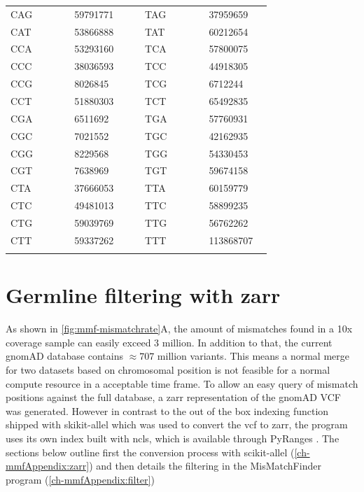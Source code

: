 \begin{table}[!ht]
\begin{tabular}{|C{0.2\linewidth} | R{0.15\linewidth}| C{0.04\linewidth} |C{0.2\linewidth} | R{0.15\linewidth}|}
CAG & \num{ 59791771} &  &TAG & \num{ 37959659} \\
CAT & \num{ 53866888} &  &TAT & \num{ 60212654} \\
CCA & \num{ 53293160} &  &TCA & \num{ 57800075} \\
CCC & \num{ 38036593} &  &TCC & \num{ 44918305} \\
CCG & \num{ 8026845} &  &TCG & \num{ 6712244} \\
CCT & \num{ 51880303} &  &TCT & \num{ 65492835} \\
CGA & \num{ 6511692} &  &TGA & \num{ 57760931} \\
CGC & \num{ 7021552} &  &TGC & \num{ 42162935} \\
CGG & \num{ 8229568} &  &TGG & \num{ 54330453} \\
CGT & \num{ 7638969} &  &TGT & \num{ 59674158} \\
CTA & \num{ 37666053} &  &TTA & \num{ 60159779} \\
CTC & \num{ 49481013} &  &TTC & \num{ 58899235} \\
CTG & \num{ 59039769} &  &TTG & \num{ 56762262} \\
CTT & \num{ 59337262} &  &TTT & \num{ 113868707} \\
\hhline{|-|-|~|-|-|}
\bottomrule
\end{tabular}
\end{table}

\afterpage{\clearpage}


\section{Germline filtering with zarr}
\label{ch-mmfAppendix:germlineFilter}
As shown in \autoref{fig:mmf-mismatchrate}A, the amount of mismatches found in a 10x coverage sample can easily exceed $3$ million. In addition to that, the current gnomAD database contains $ \approx 707$ million variants. This means a normal merge for two datasets based on chromosomal position is not feasible for a normal compute resource in a acceptable time frame. To allow an easy query of mismatch positions against the full database, a zarr \cite{Miles2021}representation of the gnomAD VCF was generated. However in contrast to the out of the box indexing function shipped with skikit-allel \cite{Miles2021a} which was used to convert the vcf to zarr, the program uses its own index built with ncls, which is available through PyRanges \cite{Stovner2019}. The sections below outline first the conversion process with scikit-allel (\autoref{ch-mmfAppendix:zarr}) and then details the filtering in the MisMatchFinder program (\autoref{ch-mmfAppendix:filter})

